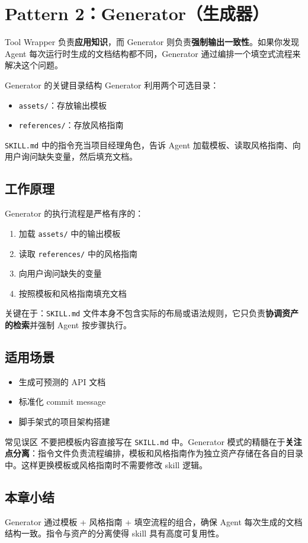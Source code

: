 \section{Pattern 2：Generator（生成器）}

Tool Wrapper 负责\textbf{应用知识}，而 Generator 则负责\textbf{强制输出一致性}。如果你发现 Agent 每次运行时生成的文档结构都不同，Generator 通过编排一个填空式流程来解决这个问题。

\begin{importantbox}{Generator 的关键目录结构}
Generator 利用两个可选目录：
\begin{itemize}
    \item \texttt{assets/}：存放输出模板
    \item \texttt{references/}：存放风格指南
\end{itemize}
\texttt{SKILL.md} 中的指令充当项目经理角色，告诉 Agent 加载模板、读取风格指南、向用户询问缺失变量，然后填充文档。
\end{importantbox}

\subsection{工作原理}

Generator 的执行流程是严格有序的：

\begin{enumerate}
    \item 加载 \texttt{assets/} 中的输出模板
    \item 读取 \texttt{references/} 中的风格指南
    \item 向用户询问缺失的变量
    \item 按照模板和风格指南填充文档
\end{enumerate}

关键在于：\texttt{SKILL.md} 文件本身不包含实际的布局或语法规则，它只负责\textbf{协调资产的检索}并强制 Agent 按步骤执行。

\subsection{适用场景}

\begin{itemize}
    \item 生成可预测的 API 文档
    \item 标准化 commit message
    \item 脚手架式的项目架构搭建
\end{itemize}

\begin{warningbox}{常见误区}
不要把模板内容直接写在 \texttt{SKILL.md} 中。Generator 模式的精髓在于\textbf{关注点分离}：指令文件负责流程编排，模板和风格指南作为独立资产存储在各自的目录中。这样更换模板或风格指南时不需要修改 skill 逻辑。
\end{warningbox}

\subsection{本章小结}

Generator 通过模板 + 风格指南 + 填空流程的组合，确保 Agent 每次生成的文档结构一致。指令与资产的分离使得 skill 具有高度可复用性。


